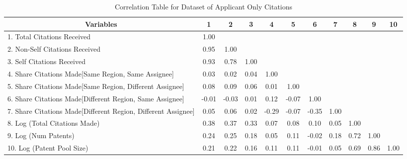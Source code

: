 \documentclass[12pt,letterpaper]{article}
\begin{document}
\begin{center}
\begin{table}[htbp]\centering \caption{Correlation Table for Dataset of Applicant Only Citations  \label{a.corrtable}}
\scriptsize
\singlespacing
\begin{adjustbox}{angle=0}
\begin{tabular}{l  c  c  c  c  c  c  c  c  c  c }

\hline
\multicolumn{1}{c}{Variables} &1&2&3&4&5&6&7&8&9&10\\ \hline
1. Total Citations Received&1.00\\
2. Non-Self Citations Received&0.95&1.00\\
3. Self Citations Received&0.93&0.78&1.00\\
4. Share Citations Made[Same Region, Same Assignee]&0.03&0.02&0.04&1.00\\
5. Share Citations Made[Same Region, Different Assignee]&0.08&0.09&0.06&0.01&1.00\\
6. Share Citations Made[Different Region, Same Assignee]&-0.01&-0.03&0.01&0.12&-0.07&1.00\\
7. Share Citations Made[Different Region, Different Assignee]&0.05&0.06&0.02&-0.29&-0.07&-0.35&1.00\\
8. Log (Total Citations Made)&0.38&0.37&0.33&0.07&0.08&0.10&0.05&1.00\\
9. Log (Num Patents)&0.24&0.25&0.18&0.05&0.11&-0.02&0.18&0.72&1.00\\
10. Log (Patent Pool Size)&0.21&0.22&0.16&0.11&0.11&-0.01&0.05&0.69&0.86&1.00\\ \hline
\end{tabular}
\end{adjustbox}
\end{table}
\end{center}
\end{document}
